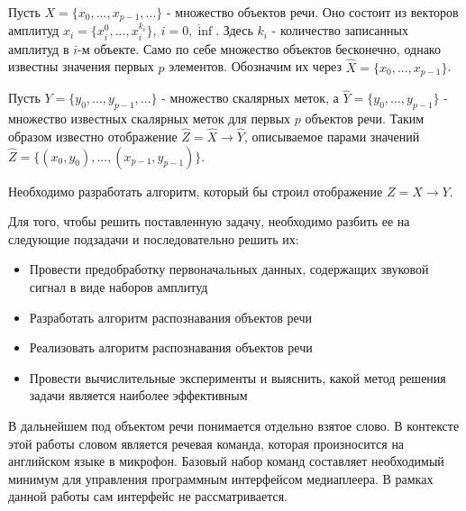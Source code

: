 Пусть $X=\{x_0, ..., x_{p-1}, ...\}$ - множество объектов речи. Оно состоит из векторов амплитуд $x_i=\{x_i^0, ..., x_i^{k_i}\},~i=\overline{0,\inf}$. Здесь $k_i$ - количество записанных амплитуд в $i$-м объекте. Само по себе множество объектов бесконечно, однако известны значения первых $p$ элементов. Обозначим их через $\widehat{X}=\{x_0, ..., x_{p-1}\}$.  

Пусть $Y=\{y_0, ..., y_{p-1}, ...\}$ - множество скалярных меток, а $\widehat{Y}=\{y_0, ..., y_{p-1}\}$ - множество известных скалярных меток для первых $p$ объектов речи. Таким образом известно отображение $\widehat{Z}=\widehat{X} \rightarrow \widehat{Y}$, описываемое парами значений $\widehat{Z}=\{(x_0, y_0), ..., (x_{p-1}, y_{p-1})\}$.

Необходимо разработать алгоритм, который бы строил отображение $Z = X \rightarrow Y$.


Для того, чтобы решить поставленную задачу, необходимо разбить ее на следующие подзадачи и последовательно решить их:
\begin{itemize}[leftmargin=2cm]
\item Провести предобработку первоначальных данных, содержащих звуковой сигнал в виде наборов амплитуд
\item Разработать алгоритм распознавания объектов речи
\item Реализовать алгоритм распознавания объектов речи
\item Провести вычислительные эксперименты и выяснить, какой метод решения задачи является наиболее эффективным
\end{itemize}


В дальнейшем под объектом речи понимается отдельно взятое слово. В контексте этой работы словом является речевая команда, которая произносится на английском языке в микрофон. Базовый набор команд составляет необходимый минимум для управления программным интерфейсом медиаплеера. В рамках данной работы сам интерфейс не рассматривается.